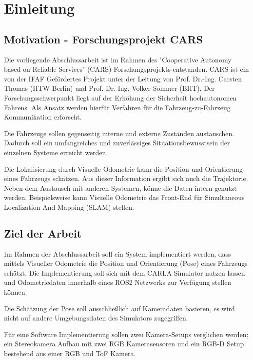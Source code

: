 \chapter{Einleitung}
\section{Motivation - Forschungsprojekt CARS}
Die vorliegende Abschlussarbeit ist im Rahmen des "Cooperative Autonomy based on Reliable Services"  (CARS) Forschungsprojekts entstanden. CARS ist ein von der IFAF Gefördertes Projekt unter der Leitung von Prof. Dr.-Ing. Carsten Thomas (HTW Berlin) und Prof. Dr.-Ing. Volker Sommer (BHT). Der Forschungsschwerpunkt liegt auf der Erhöhung der Sicherheit hochautonomen Fahrens. Als Ansatz werden hierfür Verfahren für die Fahrzeug-zu-Fahrzeug Kommunikation erforscht.
\newline 

Die Fahrzeuge sollen gegenseitig interne und externe Zuständen austauschen. Dadurch soll ein umfangreiches und zuverlässiges Situationsbewusstsein der einzelnen Systeme erreicht werden. 
\newline 

Die Lokalisierung durch Visuelle Odometrie kann die Position und Orientierung eines Fahrzeugs schätzen. Aus dieser Information ergibt sich auch die Trajektorie. Neben dem Austausch mit anderen Systemen, könne die Daten intern genutzt werden. Beispielsweise kann Visuelle Odometrie das  Front-End für Simultaneous Localization And Mapping (SLAM) stellen.

\section{Ziel der Arbeit}
Im Rahmen der Abschlussarbeit soll ein System implementiert werden, dass mittels Visueller Odometrie die Position und Orientierung (Pose) eines Fahrzeugs schätzt. Die Implementierung soll sich mit dem CARLA Simulator nutzen lassen und Odometriedaten innerhalb eines ROS2 Netzwerks zur Verfügung stellen können.

Die Schätzung der Pose soll ausschlie{\ss}lich auf Kameradaten basieren, es wird nicht auf andere Umgebungsdaten des Simulators zugegriffen. 

Für eine Software Implementierung sollen zwei Kamera-Setups verglichen werden; ein Stereokamera Aufbau mit zwei RGB Kamerasensoren und ein RGB-D Setup bestehend aus einer RGB und ToF Kamera.
 